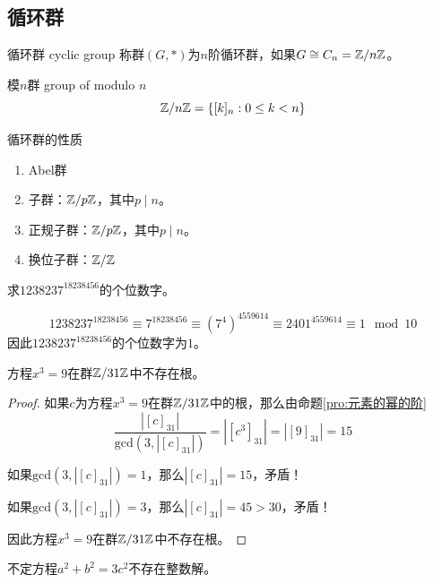 \subsection{循环群}

\begin{definition}{循环群 cyclic group}
	称群$(G,*)$为$n$阶循环群，如果$G\cong C_n=\mathbb{Z}/n\mathbb{Z}$。
\end{definition}

\begin{definition}{模$n$群 group of modulo $n$}
	$$
	\mathbb{Z}/n\mathbb{Z}=\{ [k]_n:0\le k<n \}
	$$
\end{definition}

\begin{proposition}{循环群的性质}
	\begin{enumerate}
		\item Abel群
		\item 子群：$\mathbb{Z}/p\mathbb{Z}$，其中$p\mid n$。
		\item 正规子群：$\mathbb{Z}/p\mathbb{Z}$，其中$p\mid n$。
		\item 换位子群：$\mathbb{Z}/\mathbb{Z}$
	\end{enumerate}
\end{proposition}

\begin{problem}
	求$1238237^{18238456}$的个位数字。
\end{problem}

\begin{solution}
	$$
	1238237^{18238456}\equiv 7^{18238456}\equiv(7^4)^{4559614}\equiv2401^{4559614}\equiv1\mod 10
	$$
	因此$1238237^{18238456}$的个位数字为$1$。
\end{solution}

\begin{problem}
	方程$x^3=9$在群$\mathbb{Z}/31\mathbb{Z}$中不存在根。
\end{problem}

\begin{proof}
	如果$c$为方程$x^3=9$在群$\mathbb{Z}/31\mathbb{Z}$中的根，那么由命题\ref{pro:元素的幂的阶}
	$$
	\frac{|[c]_{31}|}{\mathrm{gcd}(3,|[c]_{31}|)}=|[c^3]_{31}|=|[9]_{31}|=15
	$$
	
	如果$\mathrm{gcd}(3,|[c]_{31}|)=1$，那么$|[c]_{31}|=15$，矛盾！
	
	如果$\mathrm{gcd}(3,|[c]_{31}|)=3$，那么$|[c]_{31}|=45>30$，矛盾！
	
	因此方程$x^3=9$在群$\mathbb{Z}/31\mathbb{Z}$中不存在根。
\end{proof}

\begin{problem}
	不定方程$a^2+b^2=3c^2$不存在整数解。
\end{problem}

